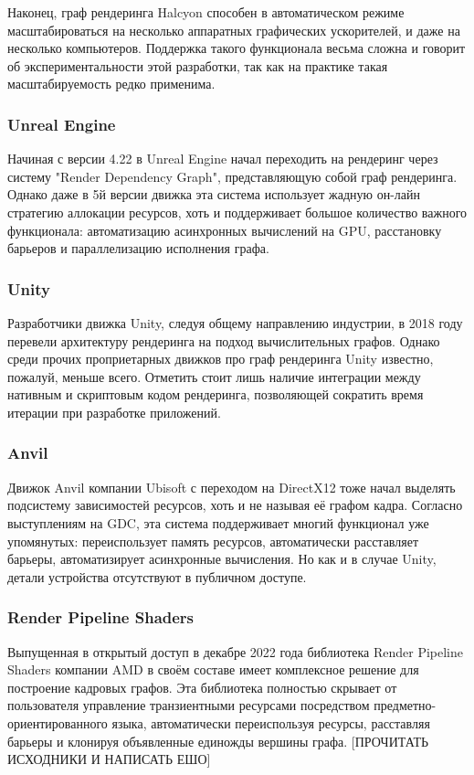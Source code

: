 Наконец, граф рендеринга Halcyon способен в автоматическом режиме масштабироваться на несколько аппаратных графических ускорителей, и даже на несколько компьютеров. Поддержка такого функционала весьма сложна и говорит об экспериментальности этой разработки, так как на практике такая масштабируемость редко применима.

\subsubsection*{Unreal Engine}
Начиная с версии 4.22 в Unreal Engine начал переходить на рендеринг через систему "Render Dependency Graph"\cite{UERenderDependencyGraph}, представляющую собой граф рендеринга. Однако даже в 5й версии движка эта система использует жадную он-лайн стратегию аллокации ресурсов, хоть и поддерживает большое количество важного функционала: автоматизацию асинхронных вычислений на GPU, расстановку барьеров и параллелизацию исполнения графа.

\subsubsection*{Unity}
Разработчики движка Unity, следуя общему направлению индустрии, в 2018 году перевели архитектуру рендеринга на подход вычислительных графов\cite{UnityRenderingArchitectureTalk}. Однако среди прочих проприетарных движков про граф рендеринга Unity известно, пожалуй, меньше всего. Отметить стоит лишь наличие интеграции между нативным и скриптовым кодом рендеринга, позволяющей сократить время итерации при разработке приложений.

\subsubsection*{Anvil}
Движок Anvil компании Ubisoft с переходом на DirectX12 тоже начал выделять подсистему зависимостей ресурсов, хоть и не называя её графом кадра\cite{DX12CaseStudies}\cite{AnvilDx12LessonsLearned}. Согласно выступлениям на GDC, эта система поддерживает многий функционал уже упомянутых: переиспользует память ресурсов, автоматически расставляет барьеры, автоматизирует асинхронные вычисления. Но как и в случае Unity, детали устройства отсутствуют в публичном доступе.

\subsubsection*{Render Pipeline Shaders}
Выпущенная в открытый доступ\cite{RPSgithub} в декабре 2022 года библиотека Render Pipeline Shaders компании AMD в своём составе имеет комплексное решение для построение кадровых графов\cite{RPSpost}. Эта библиотека полностью скрывает от пользователя управление транзиентными ресурсами посредством предметно-ориентированного языка, автоматически переиспользуя ресурсы, расставляя барьеры и клонируя объявленные единожды вершины графа. [ПРОЧИТАТЬ ИСХОДНИКИ И НАПИСАТЬ ЕШО]


